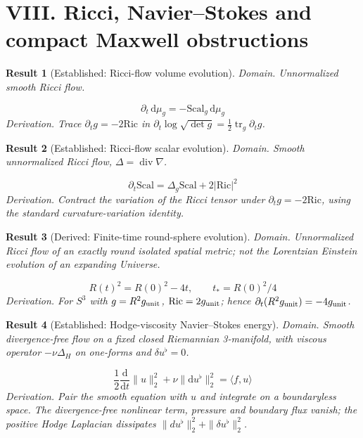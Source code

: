 \documentclass[aps,prd,onecolumn,notitlepage,groupedaddress,11pt]{revtex4-2}
\newtheorem{result}{Result}
\begin{document}
\section{VIII. Ricci, Navier--Stokes and compact Maxwell obstructions}

\begin{result}[\textsf{Established}: Ricci-flow volume evolution]\label{res:43}
\textit{Domain.} Unnormalized smooth Ricci flow.\par
\begin{equation}\label{eq:43}
\partial_t\,\mathrm d\mu_g=-\mathrm{Scal}_g\,\mathrm d\mu_g
\end{equation}
\textit{Derivation.} Trace $\partial_tg=-2\mathrm{Ric}$ in $\partial_t\log\sqrt{\det g}=\frac12\operatorname{tr}_g\partial_tg$.
\end{result}

\begin{result}[\textsf{Established}: Ricci-flow scalar evolution]\label{res:44}
\textit{Domain.} Smooth unnormalized Ricci flow, $\Delta=\operatorname{div}\nabla$.\par
\begin{equation}\label{eq:44}
\partial_t\mathrm{Scal}=\Delta_g\mathrm{Scal}+2|\mathrm{Ric}|^2
\end{equation}
\textit{Derivation.} Contract the variation of the Ricci tensor under $\partial_tg=-2\mathrm{Ric}$, using the standard curvature-variation identity.
\end{result}

\begin{result}[\textsf{Derived}: Finite-time round-sphere evolution]\label{res:45}
\textit{Domain.} Unnormalized Ricci flow of an exactly round isolated spatial metric; not the Lorentzian Einstein evolution of an expanding Universe.\par
\begin{equation}\label{eq:45}
R(t)^2=R(0)^2-4t,\qquad t_*=R(0)^2/4
\end{equation}
\textit{Derivation.} For $S^3$ with $g=R^2g_{\rm unit}$, $\mathrm{Ric}=2g_{\rm unit}$; hence $\partial_t(R^2g_{\rm unit})=-4g_{\rm unit}$.
\end{result}

\begin{result}[\textsf{Established}: Hodge-viscosity Navier--Stokes energy]\label{res:46}
\textit{Domain.} Smooth divergence-free flow on a fixed closed Riemannian 3-manifold, with viscous operator $-\nu\Delta_H$ on one-forms and $\delta u^\flat=0$.\par
\begin{equation}\label{eq:46}
\frac12\frac{\mathrm d}{\mathrm dt}\|u\|_2^2+\nu\|\mathrm d u^\flat\|_2^2=\langle f,u\rangle
\end{equation}
\textit{Derivation.} Pair the smooth equation with $u$ and integrate on a boundaryless space. The divergence-free nonlinear term, pressure and boundary flux vanish; the positive Hodge Laplacian dissipates $\|du^\flat\|_2^2+\|\delta u^\flat\|_2^2$.
\end{result}
\end{document}
